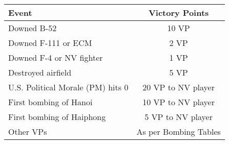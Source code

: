 \renewcommand{\arraystretch}{1.2}
\begin{tabular}{l c}
  \hline
  \textbf{Event} & \textbf{Victory Points} \\
  \hline
  Downed B-52 & 10 VP \\
  Downed F-111 or ECM & 2 VP \\
  Downed F-4 or NV fighter & 1 VP \\
  Destroyed airfield & 5 VP \\
  U.S. Political Morale (PM) hits 0 & 20 VP to NV player \\
  First bombing of Hanoi & 10 VP to NV player \\
  First bombing of Haiphong & 5 VP to NV player \\
  Other VPs & As per Bombing Tables \\
  \hline
\end{tabular}
